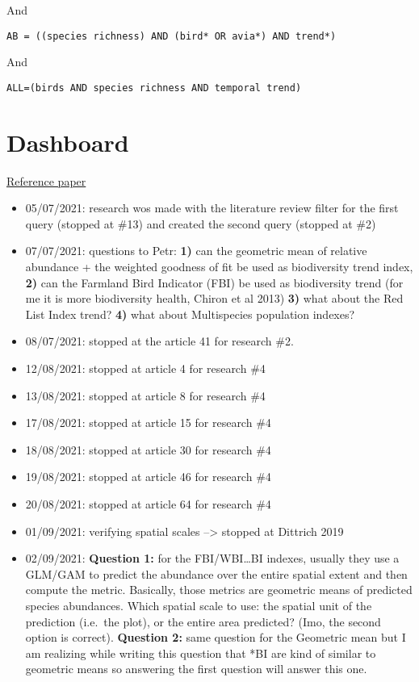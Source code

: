 \documentclass[
  12pt,
  oneside]{report}
\begin{document}
And

\begin{verbatim}
AB = ((species richness) AND (bird* OR avia*) AND trend*) 
\end{verbatim}

And

\begin{verbatim}
ALL=(birds AND species richness AND temporal trend)
\end{verbatim}

\hypertarget{dashboard}{%
\chapter*{Dashboard}\label{dashboard}}

\href{https://www.sciencedirect.com/science/article/pii/S1470160X20306658?via\%3Dihub}{Reference paper}

\begin{itemize}
\item
  05/07/2021: research wos made with the literature review filter for the first query (stopped at \#13) and created the second query (stopped at \#2)
\item
  07/07/2021: questions to Petr: \textbf{1)} can the geometric mean of relative abundance + the weighted goodness of fit be used as biodiversity trend index, \textbf{2)} can the Farmland Bird Indicator (FBI) be used as biodiversity trend (for me it is more biodiversity health, Chiron et al 2013) \textbf{3)} what about the Red List Index trend? \textbf{4)} what about Multispecies population indexes?
\item
  08/07/2021: stopped at the article 41 for research \#2.
\item
  12/08/2021: stopped at article 4 for research \#4
\item
  13/08/2021: stopped at article 8 for research \#4
\item
  17/08/2021: stopped at article 15 for research \#4
\item
  18/08/2021: stopped at article 30 for research \#4
\item
  19/08/2021: stopped at article 46 for research \#4
\item
  20/08/2021: stopped at article 64 for research \#4
\item
  01/09/2021: verifying spatial scales --\textgreater{} stopped at Dittrich 2019
\item
  02/09/2021: \textbf{Question 1:} for the FBI/WBI\ldots*BI indexes, usually they use a GLM/GAM to predict the abundance over the entire spatial extent and then compute the metric. Basically, those metrics are geometric means of predicted species abundances. Which spatial scale to use: the spatial unit of the prediction (i.e.~the plot), or the entire area predicted? (Imo, the second option is correct). \textbf{Question 2:} same question for the Geometric mean but I am realizing while writing this question that *BI are kind of similar to geometric means so answering the first question will answer this one.
\end{itemize}
\end{document}
